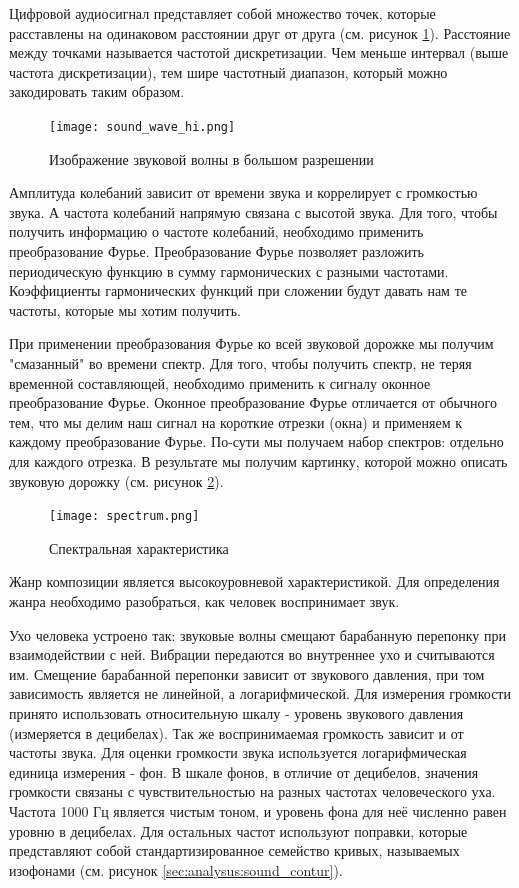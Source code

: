 Цифровой аудиосигнал представляет собой множество точек, которые расставлены на одинаковом расстоянии друг от друга (см. рисунок \ref{sec:analysus:sound_wave_hi}). Расстояние между точками называется частотой дискретизации. Чем меньше интервал (выше частота дискретизации), тем шире частотный диапазон, который можно закодировать таким образом.

\begin{figure}[t]
\centering
	\texttt{[image: sound\_wave\_hi.png]}
	\caption{Изображение звуковой волны в большом разрешении}
	\label{sec:analysus:sound_wave_hi}
\end{figure}

Амплитуда колебаний зависит от времени звука и коррелирует с громкостью звука. А частота колебаний напрямую связана с высотой звука. Для того, чтобы получить информацию о частоте колебаний, необходимо применить преобразование Фурье. Преобразование Фурье позволяет разложить периодическую функцию в сумму гармонических с разными частотами. Коэффициенты гармонических функций при сложении будут давать нам те частоты, которые мы хотим получить.

При применении преобразования Фурье ко всей звуковой дорожке мы получим "смазанный" во времени спектр. Для того, чтобы получить спектр, не теряя временной составляющей, необходимо применить к сигналу оконное преобразование Фурье. Оконное преобразование Фурье отличается от обычного тем, что мы делим наш сигнал на короткие отрезки (окна) и применяем к каждому преобразование Фурье. По-сути мы получаем набор спектров: отдельно для каждого отрезка. В результате мы получим картинку, которой можно описать звуковую дорожку (см. рисунок \ref{sec:analysus:spectrum}).

\begin{figure}[t]
\centering
	\texttt{[image: spectrum.png]}
	\caption{Спектральная характеристика}
	\label{sec:analysus:spectrum}
\end{figure}

Жанр композиции является высокоуровневой характеристикой. Для определения жанра необходимо разобраться, как человек воспринимает звук.

Ухо человека устроено так: звуковые волны смещают барабанную перепонку при взаимодействии с ней. Вибрации передаются во внутреннее ухо и считываются им. Смещение барабанной перепонки зависит от звукового давления, при том зависимость является не линейной, а логарифмической. Для измерения громкости принято использовать относительную шкалу - уровень звукового давления (измеряется в децибелах). Так же воспринимаемая громкость зависит и от частоты звука. Для оценки громкости звука используется логарифмическая единица измерения - фон. В шкале фонов, в отличие от децибелов, значения громкости связаны с чувствительностью на разных частотах человеческого уха. Частота 1000 Гц является чистым тоном, и уровень фона для неё численно равен уровню в децибелах. Для остальных частот используют поправки, которые представляют собой стандартизированное семейство кривых, называемых изофонами (см. рисунок \ref{sec:analysus:sound_contur}).

